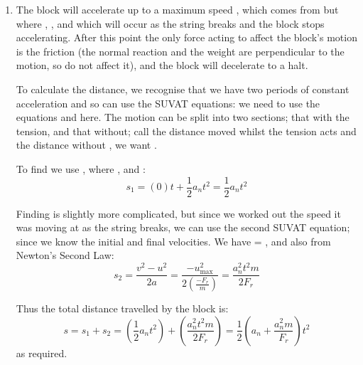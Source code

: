 \begin{problem}[A1987PSIIQ9a]
{\begin{enumerate}
	\item The block will accelerate up to a maximum speed , which comes from \value{v}{u + at}{} but where , , \value{t}{t}{} and  which will occur as the string breaks and the block stops accelerating. After this point the only force acting to affect the block's motion is the friction (the normal reaction and the weight are perpendicular to the motion, so do not affect it), and the block will decelerate to a halt.

To calculate the distance, we recognise that we have two periods of constant acceleration and so can use the SUVAT equations: we need to use the equations  and  here. The motion can be split into two sections; that with the tension, and that without; call the distance moved whilst the tension acts  and the distance without , we want .

To find  we use , where ,  and \value{t}{t}{}:
\begin{equation*} 
s_{1} = (0)t + \frac{1}{2} a_{n}t^{2} = \frac{1}{2} a_{n}t^{2} 
\end{equation*}

Finding  is slightly more complicated, but since we worked out the speed it was moving at as the string breaks, we can use the second SUVAT equation; since we know the initial and final velocities. We have  = ,  and also  from Newton's Second Law:
\begin{equation*}
 s_{2} = \frac{v^{2} - u^{2}}{2a} = \frac{- u_{\text{max}}^{2}}{2\left( \frac{-F_{r}}{m} \right)} = \frac{a_{n}^{2} t^{2} m}{2 F_{r}} 
 \end{equation*}

Thus the total distance travelled by the block is:
\begin{equation*} 
s = s_{1} + s_{2} = \left( \frac{1}{2}a_{n}t^2 \right) + \left( \frac{a_{n}^{2}t^{2}m}{2F_{r}} \right) = \frac{1}{2} \left(a_{n} + \frac{a_{n}^{2}m}{F_{r}} \right)t^{2}
\end{equation*}
as required.


\end{enumerate}}
\end{problem}
